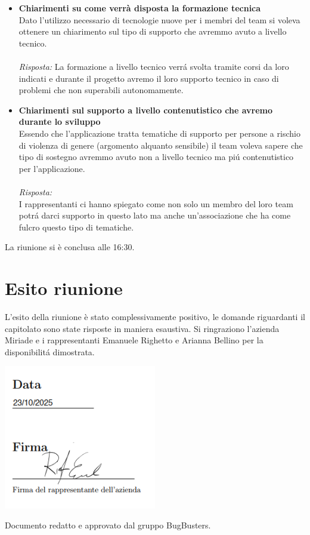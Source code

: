 \documentclass[a4paper,12pt]{article}
\begin{document}
\begin{itemize}
    \item \textbf{Chiarimenti su come verrà disposta la formazione tecnica}\\
    \noindent
    Dato l'utilizzo necessario di tecnologie nuove per i membri del team si voleva ottenere un chiarimento sul tipo di supporto che avremmo avuto a livello tecnico. \\ \\
    \textit{Risposta:} 
    La formazione a livello tecnico verrá svolta tramite corsi da loro indicati e durante il progetto avremo il loro supporto tecnico in caso di problemi che non superabili autonomamente.
    \vspace{1em}

    \item \textbf{Chiarimenti sul supporto a livello contenutistico che avremo durante lo sviluppo}\\
    \noindent
    Essendo che l'applicazione tratta tematiche di supporto per persone a rischio di violenza di genere (argomento alquanto sensibile) il team voleva sapere che tipo di sostegno avremmo avuto non a livello tecnico ma piú contenutistico per l'applicazione. \\ \\
    \textit{Risposta:} \\
    I rappresentanti ci hanno spiegato come non solo un membro del loro team potrá darci supporto in questo lato ma anche un'associazione che ha come fulcro questo tipo di tematiche.
    \vspace{1em}
\end{itemize}

La riunione si è conclusa alle 16:30.


\section{Esito riunione}
    L'esito della riunione è stato complessivamente positivo, le domande riguardanti il capitolato sono state risposte in maniera esaustiva. Si ringraziono l'azienda Miriade e i rappresentanti Emanuele Righetto e Arianna Bellino per la disponibilitá dimostrata.
    

\vspace{1.0cm}
\noindent
\includegraphics[width=0.5\textwidth]{Data e firma.png}

\vfill
\begin{center}
    {\small\color{darkgray} Documento redatto e approvato dal gruppo BugBusters.}
\end{center}
\end{document}
